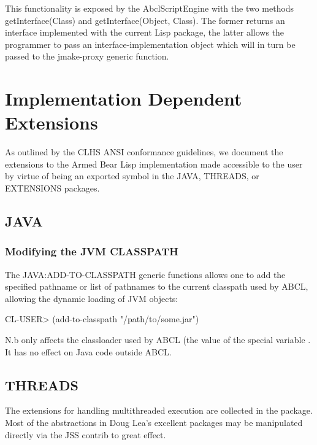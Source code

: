 \documentclass[10pt]{book}
\begin{document}
This functionality is exposed by the AbclScriptEngine with the two
methods getInterface(Class) and getInterface(Object, Class). The
former returns an interface implemented with the current Lisp package,
the latter allows the programmer to pass an interface-implementation
object which will in turn be passed to the jmake-proxy generic
function.

\chapter{Implementation Dependent Extensions}

As outlined by the CLHS ANSI conformance guidelines, we document the
extensions to the Armed Bear Lisp implementation made accessible to
the user by virtue of being an exported symbol in the JAVA, THREADS,
or EXTENSIONS packages.

\section{JAVA}

\subsection{Modifying the JVM CLASSPATH}

The JAVA:ADD-TO-CLASSPATH generic functions allows one to add the
specified pathname or list of pathnames to the current classpath
used by ABCL, allowing the dynamic loading of JVM objects:

\begin{listing-lisp}
CL-USER> (add-to-classpath "/path/to/some.jar")
\end{listing-lisp}

N.b  only affects the classloader used by ABCL
(the value of the special variable . It has
no effect on Java code outside ABCL.



\section{THREADS}

The extensions for handling multithreaded execution are collected in
the  package.  Most of the abstractions in Doug Lea's
excellent  packages may be manipulated
directly via the JSS contrib to great effect.
\end{document}
